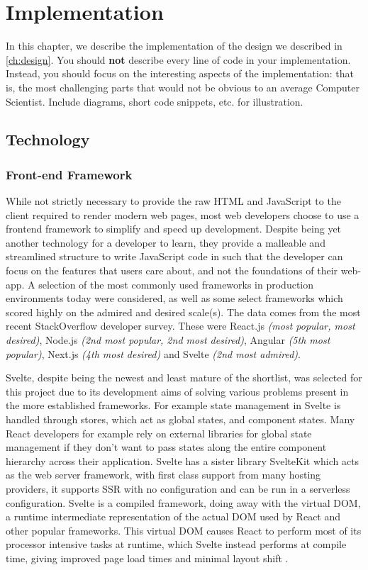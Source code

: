 \chapter{Implementation}
\label{ch:implementation}

In this chapter, we describe the implementation of the design we described in \ref{ch:design}. You should \textbf{not} describe every line of code in your implementation. Instead, you should focus on the interesting aspects of the implementation: that is, the most challenging parts that would not be obvious to an average Computer Scientist. Include diagrams, short code snippets, etc. for illustration. 

\section{Technology}
\label{se:tech}
\subsection{Front-end Framework}
\label{sse:frontendframework}
While not strictly necessary to provide the raw HTML and JavaScript to the client required to render modern web pages, most web developers choose to use a frontend framework to simplify and speed up development. Despite being yet another technology for a developer to learn, they provide a malleable and streamlined structure to write JavaScript code in such that the developer can focus on the features that users care about, and not the foundations of their web-app. A selection of the most commonly used frameworks in production environments today were considered, as well as some select frameworks which scored highly on the admired and desired scale(s). The data comes from the most recent StackOverflow developer survey. These were React.js \textit{(most popular, most desired)}, Node.js \textit{(2nd most popular, 2nd most desired)}, Angular \textit{(5th most popular)}, Next.js \textit{(4th most desired)} and Svelte \textit{(2nd most admired)}\cite{StackOverflow2023Survey}.

Svelte, despite being the newest and least mature of the shortlist, was selected for this project due to its development aims of solving various problems present in the more established frameworks. For example state management in Svelte is handled through stores, which act as global states, and component states. Many React developers for example rely on external libraries for global state management if they don't want to pass states along the entire component hierarchy across their application. Svelte has a sister library SvelteKit which acts as the web server framework, with first class support from many hosting providers, it supports SSR with no configuration and can be run in a serverless configuration. Svelte is a compiled framework, doing away with the virtual DOM, a runtime intermediate representation of the actual DOM used by React and other popular frameworks. This virtual DOM causes React to perform most of its processor intensive tasks at runtime, which Svelte instead performs at compile time, giving improved page load times and minimal layout shift \cite{virtual-dom-overhead}.

